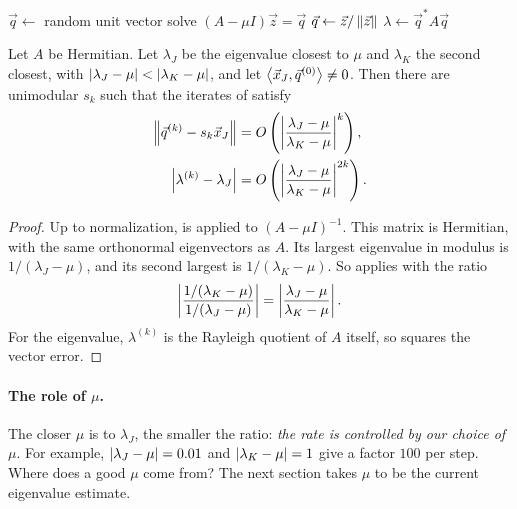 \begin{algorithm}[H]
  \caption{Inverse iteration with a fixed shift $\mu$.}
  \label{alg:inverse}
  \begin{algorithmic}[1]
    \State $\vec{q} \gets$ random unit vector
      \State solve $(A - \mu I)\vec{z} = \vec{q}$
      \State $\vec{q} \gets \vec{z}/\left\lVert \vec{z} \right\rVert$
      \State $\lambda \gets \vec{q}^\ast A\vec{q}$ 
    \EndFor
  \end{algorithmic}
\end{algorithm}

\begin{theorem}
  \label{thm:inverse-iter}
  Let $A$ be Hermitian. Let $\lambda_J$ be the eigenvalue closest to $\mu$ and $\lambda_K$ the second closest, with $\left\lvert \lambda_J - \mu \right\rvert < \left\lvert \lambda_K - \mu \right\rvert$, and let $\left\langle \vec{x}_J, \vec{q}^{(0)} \right\rangle \ne 0$. Then there are unimodular $s_k$ such that the iterates of  satisfy
  \begin{align}
    \left\lVert \vec{q}^{(k)} - s_k\vec{x}_J \right\rVert &= O\left(\left\lvert \frac{\lambda_J - \mu}{\lambda_K - \mu} \right\rvert^k\right), \\
    \left\lvert \lambda^{(k)} - \lambda_J \right\rvert &= O\left(\left\lvert \frac{\lambda_J - \mu}{\lambda_K - \mu} \right\rvert^{2k}\right).
  \end{align}
\end{theorem}

\begin{proof}
  Up to normalization,  is  applied to $(A - \mu I)^{-1}$. This matrix is Hermitian, with the same orthonormal eigenvectors as $A$. Its largest eigenvalue in modulus is $1/(\lambda_J - \mu)$, and its second largest is $1/(\lambda_K - \mu)$. So  applies with the ratio
  \begin{equation*}
    \left\lvert \frac{1/(\lambda_K - \mu)}{1/(\lambda_J - \mu)} \right\rvert = \left\lvert \frac{\lambda_J - \mu}{\lambda_K - \mu} \right\rvert.
  \end{equation*}
  For the eigenvalue, $\lambda^{(k)}$ is the Rayleigh quotient of $A$ itself, so  squares the vector error.
\end{proof}

\paragraph{The role of $\mu$.} The closer $\mu$ is to $\lambda_J$, the smaller the ratio: \emph{the rate is controlled by our choice of $\mu$}. For example, $\left\lvert \lambda_J - \mu \right\rvert = 0.01$ and $\left\lvert \lambda_K - \mu \right\rvert = 1$ give a factor $100$ per step. Where does a good $\mu$ come from? The next section takes $\mu$ to be the current eigenvalue estimate.

